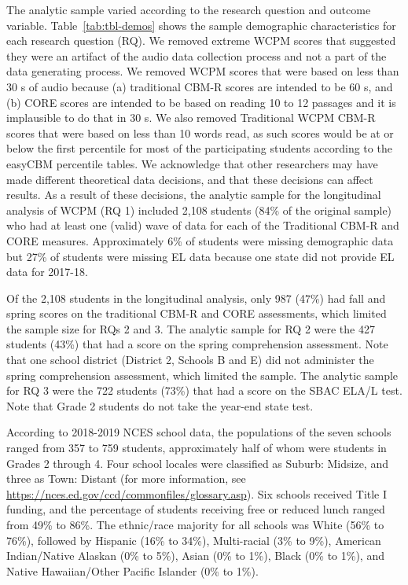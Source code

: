 \documentclass[
  english,
  man, fleqn, noextraspace]{apa6}
\begin{document}
The analytic sample varied according to the research question and outcome variable. Table~\ref{tab:tbl-demos} shows the sample demographic characteristics for each research question (RQ). We removed extreme WCPM scores that suggested they were an artifact of the audio data collection process and not a part of the data generating process. We removed WCPM scores that were based on less than 30 s of audio because (a) traditional CBM-R scores are intended to be 60 s, and (b) CORE scores are intended to be based on reading 10 to 12 passages and it is implausible to do that in 30 s. We also removed Traditional WCPM CBM-R scores that were based on less than 10 words read, as such scores would be at or below the first percentile for most of the participating students according to the easyCBM percentile tables. We acknowledge that other researchers may have made different theoretical data decisions, and that these decisions can affect results. As a result of these decisions, the analytic sample for the longitudinal analysis of WCPM (RQ 1) included 2,108 students (84\% of the original sample) who had at least one (valid) wave of data for each of the Traditional CBM-R and CORE measures. Approximately 6\% of students were missing demographic data but 27\% of students were missing EL data because one state did not provide EL data for 2017-18.

Of the 2,108 students in the longitudinal analysis, only 987 (47\%) had fall and spring scores on the traditional CBM-R and CORE assessments, which limited the sample size for RQs 2 and 3. The analytic sample for RQ 2 were the 427 students (43\%) that had a score on the spring comprehension assessment. Note that one school district (District 2, Schools B and E) did not administer the spring comprehension assessment, which limited the sample. The analytic sample for RQ 3 were the 722 students (73\%) that had a score on the SBAC ELA/L test. Note that Grade 2 students do not take the year-end state test.

According to 2018-2019 NCES school data, the populations of the seven schools ranged from 357 to 759 students, approximately half of whom were students in Grades 2 through 4. Four school locales were classified as Suburb: Midsize, and three as Town: Distant (for more information, see \url{https://nces.ed.gov/ccd/commonfiles/glossary.asp}). Six schools received Title I funding, and the percentage of students receiving free or reduced lunch ranged from 49\% to 86\%. The ethnic/race majority for all schools was White (56\% to 76\%), followed by Hispanic (16\% to 34\%), Multi-racial (3\% to 9\%), American Indian/Native Alaskan (0\% to 5\%), Asian (0\% to 1\%), Black (0\% to 1\%), and Native Hawaiian/Other Pacific Islander (0\% to 1\%).
\end{document}
